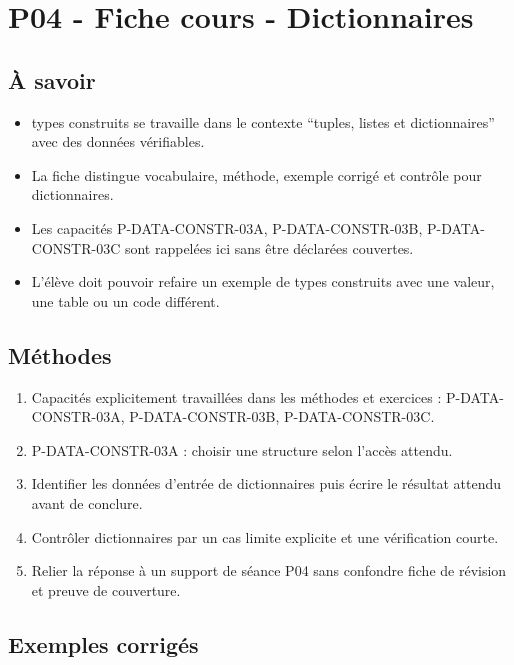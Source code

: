 \section{P04 - Fiche cours - Dictionnaires}

\subsection{À savoir}

\begin{itemize}
\tightlist
\item
  types construits se travaille dans le contexte ``tuples, listes et
  dictionnaires'' avec des données vérifiables.
\item
  La fiche distingue vocabulaire, méthode, exemple corrigé et contrôle
  pour dictionnaires.
\item
  Les capacités P-DATA-CONSTR-03A, P-DATA-CONSTR-03B, P-DATA-CONSTR-03C
  sont rappelées ici sans être déclarées couvertes.
\item
  L'élève doit pouvoir refaire un exemple de types construits avec une
  valeur, une table ou un code différent.
\end{itemize}

\subsection{Méthodes}

\begin{enumerate}
\def\labelenumi{\arabic{enumi}.}
\tightlist
\item
  Capacités explicitement travaillées dans les méthodes et exercices :
  P-DATA-CONSTR-03A, P-DATA-CONSTR-03B, P-DATA-CONSTR-03C.
\item
  P-DATA-CONSTR-03A : choisir une structure selon l'accès attendu.
\item
  Identifier les données d'entrée de dictionnaires puis écrire le
  résultat attendu avant de conclure.
\item
  Contrôler dictionnaires par un cas limite explicite et une
  vérification courte.
\item
  Relier la réponse à un support de séance P04 sans confondre fiche de
  révision et preuve de couverture.
\end{enumerate}

\subsection{Exemples corrigés}

